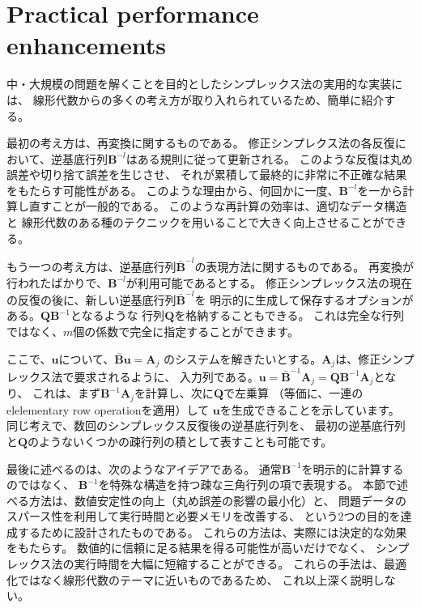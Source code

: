 \documentclass{jsarticle}
\begin{document}
\section*{Practical performance enhancements}
中・大規模の問題を解くことを目的としたシンプレックス法の実用的な実装には、
線形代数からの多くの考え方が取り入れられているため、簡単に紹介する。

最初の考え方は、再変換に関するものである。
修正シンプレクス法の各反復において、逆基底行列$\bm{B}^{-l}$はある規則に従って更新される。
このような反復は丸め誤差や切り捨て誤差を生じさせ、
それが累積して最終的に非常に不正確な結果をもたらす可能性がある。
このような理由から、何回かに一度、$\bm{B}^{-l}$を一から計算し直すことが一般的である。
このような再計算の効率は、適切なデータ構造と
線形代数のある種のテクニックを用いることで大きく向上させることができる。

もう一つの考え方は、逆基底行列$\bar{\bm{B}}^{-l}$の表現方法に関するものである。
再変換が行われたばかりで、$\bm{B}^{-l}$が利用可能であるとする。
修正シンプレックス法の現在の反復の後に、新しい逆基底行列$\bar{\bm{B}}^{-l}$を
明示的に生成して保存するオプションがある。$\bm{Q}\bm{B}^{-1}$となるような
行列$\bm{Q}$を格納することもできる。
これは完全な行列ではなく、$m$個の係数で完全に指定することができます。

ここで、$\bm{u}$について、$\bar{\bm{B}}\bm{u} = \bm{A}_j$
のシステムを解きたいとする。$\bm{A}_j$は、修正シンプレックス法で要求されるように、
入力列である。$\bm{u}=\bar{\bm{B}}^{-1}\bm{A}_j=\bm{Q}\bm{B}^{-1}\bm{A}_j$となり、
これは、まず$\bm{B}^{-1}\bm{A}_j$を計算し、次に$\bm{Q}$で左乗算
（等価に、一連のelelementary row operationを適用）して
$\bm{u}$を生成できることを示しています。
同じ考えで、数回のシンプレックス反復後の逆基底行列を、
最初の逆基底行列と$\bm{Q}$のようないくつかの疎行列の積として表すことも可能です。

最後に述べるのは、次のようなアイデアである。
通常$\bm{B}^{-1}$を明示的に計算するのではなく、
$\bm{B}^{-1}$を特殊な構造を持つ疎な三角行列の項で表現する。
本節で述べる方法は、数値安定性の向上（丸め誤差の影響の最小化）と、
問題データのスパース性を利用して実行時間と必要メモリを改善する、
という2つの目的を達成するために設計されたものである。
これらの方法は、実際には決定的な効果をもたらす。
数値的に信頼に足る結果を得る可能性が高いだけでなく、
シンプレックス法の実行時間を大幅に短縮することができる。
これらの手法は、最適化ではなく線形代数のテーマに近いものであるため、
これ以上深く説明しない。
\end{document}
